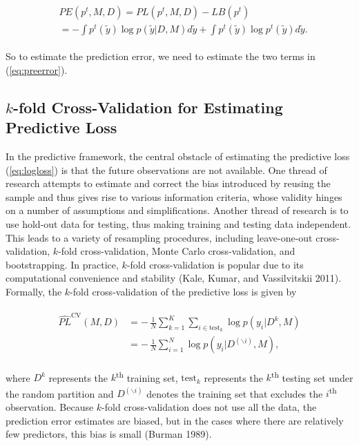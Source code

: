 \documentclass[11pt,article,oneside]{memoir}
\begin{document}
\begin{align}
\begin{split}
  \label{eq:preerror}
    &PE(p^t, M, D)= PL(p^t, M, D) - LB(p^t) \\  
               &=-\int p^t(\tilde y) \log p(\tilde y|D, M) d\tilde y+\int
               p^t(\tilde y) \log p^t(\tilde y) d\tilde y.
               \end{split}
\end{align}

So to estimate the prediction error, we need to estimate the two terms
in (\ref{eq:preerror}).

\subsection{\texorpdfstring{\(k\)-fold Cross-Validation for Estimating
Predictive
Loss}{k-fold Cross-Validation for Estimating Predictive Loss}}\label{k-fold-cross-validation-for-estimating-predictive-loss}

In the predictive framework, the central obstacle of estimating the
predictive loss (\ref{eq:logloss}) is that the future observations are
not available. One thread of research attempts to estimate and correct
the bias introduced by reusing the sample and thus gives rise to various
information criteria, whose validity hinges on a number of assumptions
and simplifications. Another thread of research is to use hold-out data
for testing, thus making training and testing data independent. This
leads to a variety of resampling procedures, including leave-one-out
cross-validation, \(k\)-fold cross-validation, Monte Carlo
cross-validation, and bootstrapping. In practice, \(k\)-fold
cross-validation is popular due to its computational convenience and
stability (Kale, Kumar, and Vassilvitskii 2011). Formally, the
\(k\)-fold cross-validation of the predictive loss is given by

\begin{align}
\begin{split}
  \label{eq:xvalesti}
  \widehat{PL}^{\text{CV}}(M, D) &=-\,\frac{1}{N}\sum_{k=1}^K\sum_{i\in
    \text{test}_k}\log p(y_i|D^k, M)\\
  &=-\,\frac{1}{N}\sum_{i=1}^N\log
  p(y_i|D^{(\backslash i)}, M),
\end{split}
\end{align}

\noindent where \(D^k\) represents the \(k\)\textsuperscript{th}
training set, \(\text{test}_k\) represents the \(k\)\textsuperscript{th}
testing set under the random partition and \(D^{(\backslash i)}\)
denotes the training set that excludes the \(i\)\textsuperscript{th}
observation. Because \(k\)-fold cross-validation does not use all the
data, the prediction error estimates are biased, but in the cases where
there are relatively few predictors, this bias is small (Burman 1989).
\end{document}
